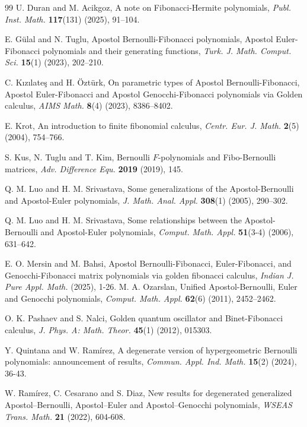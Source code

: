 \documentclass[10pt,a4paper]{amsart}
\numberwithin{equation}{section}
\begin{document}
\begin{thebibliography}{99}
U. Duran and M. Acikgoz, A note on Fibonacci-Hermite polynomials, \textit{Publ. Inst. Math.} \textbf{117}(131) (2025), 91–104.

E. G\"{u}lal and N. Tuglu, Apostol Bernoulli-Fibonacci polynomials, Apostol Euler-Fibonacci polynomials and their generating functions, \textit{Turk. J. Math. Comput. Sci.} \textbf{15}(1) (2023), 202–210.

C. K{\i}z{\i}late\c{s} and H. \"{O}zt\"{u}rk, On parametric types of Apostol Bernoulli-Fibonacci, Apostol Euler-Fibonacci and Apostol Genocchi-Fibonacci polynomials via Golden calculus, \textit{AIMS Math.} \textbf{8}(4) (2023), 8386–8402.


E. Krot, An introduction to finite fibonomial calculus, \textit{Centr. Eur. J. Math.} \textbf{2}(5) (2004), 754–766.

S. Kus, N. Tuglu and T. Kim, Bernoulli $F$-polynomials and Fibo-Bernoulli matrices, \textit{Adv. Difference Equ.} \textbf{2019} (2019), 145.

Q. M. Luo and H. M. Srivastava, Some generalizations of the Apostol-Bernoulli and Apostol-Euler polynomials, \textit{J. Math. Anal. Appl.} \textbf{308}(1) (2005), 290–302.

Q. M. Luo and H. M. Srivastava, Some relationships between the Apostol-Bernoulli and Apostol-Euler polynomials, \textit{Comput. Math. Appl.} \textbf{51}(3-4) (2006), 631–642.

E. O. Mersin and M. Bahsi, Apostol Bernoulli-Fibonacci, Euler-Fibonacci, and Genocchi-Fibonacci matrix polynomials via golden fibonacci calculus, \textit{Indian J. Pure Appl. Math.} (2025), 1-26.
M. A. Ozarslan, Unified Apostol-Bernoulli, Euler and Genocchi polynomials, \textit{Comput. Math. Appl.} \textbf{62}(6) (2011), 2452–2462.

O. K. Pashaev and S. Nalci, Golden quantum oscillator and Binet-Fibonacci calculus, \textit{J. Phys. A: Math. Theor.} \textbf{45}(1) (2012), 015303.

Y. Quintana and W. Ram\'irez, A degenerate version of hypergeometric Bernoulli polynomials: announcement of results, \textit{Commun. Appl. Ind. Math.} \textbf{15}(2) (2024), 36-43.

W. Ram\'irez, C. Cesarano and S. Diaz, New results for degenerated generalized Apostol–Bernoulli, Apostol–Euler and Apostol–Genocchi polynomials, \textit{WSEAS Trans. Math.} \textbf{21} (2022), 604-608.


\end{thebibliography}
\end{document}
